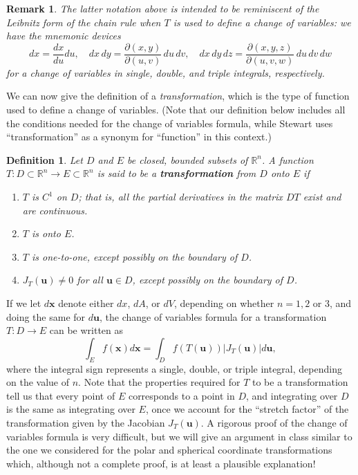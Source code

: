 \documentclass[12pt,letterpaper]{article}
\newtheorem{rem}[theorem]{Remark}
\newenvironment{remark}{\begin{rem}\rm}{\end{rem}}
\newtheorem{definition}[theorem]{Definition}
\newcommand{\R}{\mathbb{R}}
\newcommand{\x}{\mathbf{x}}
\newcommand{\uu}{\mathbf{u}}
\begin{document}
\begin{remark}
The latter notation above is intended to be reminiscent of the Leibnitz form of the chain rule when $T$ is used to define a change of variables: we have the mnemonic devices
\[
dx = \frac{dx}{du}du,\quad dx\,dy = \frac{\partial(x,y)}{\partial (u,v)}\,du\,dv,\quad dx\,dy\,dz = \frac{\partial (x,y,z)}{\partial (u,v,w)}\,du\,dv\,dw
\]
for a change of variables in single, double, and triple integrals, respectively.
\end{remark}
We can now give the definition of a {\em transformation}, which is the type of function used to define a change of variables. (Note that our definition below includes all the conditions needed for the change of variables formula, while Stewart uses ``transformation'' as a synonym for ``function'' in this context.)
\begin{definition}
Let $D$ and $E$ be closed, bounded subsets of $\R^n$. A function $T:D\subset \R^n\to E\subset \R^n$ is said to be a {\bf transformation} from $D$ onto $E$ if
\begin{enumerate}
\item $T$ is  $C^1$ on $D$; that is, all the partial derivatives in the matrix $DT$ exist and are continuous.
\item $T$ is onto $E$.
\item $T$ is one-to-one, except possibly on the boundary of $D$.
\item $J_T(\uu)\neq 0$ for all $\uu\in D$, except possibly on the boundary of $D$.
\end{enumerate}
\end{definition}
If we let $d\x$ denote either $dx$, $dA$, or $dV$, depending on whether $n=1,2$ or 3, and doing the same for  $d\uu$, the change of variables formula for a transformation $T:D\to E$ can be written as
\[
\int_E f(\x)d\x = \int_D f(T(\uu))\lvert J_T(\uu)\rvert d\uu,
\]
where the integral sign represents a single, double, or triple integral, depending on the value of $n$. Note that the properties required for $T$ to be a transformation tell us that every point of $E$ corresponds to a point in $D$, and integrating over $D$ is the same as integrating over $E$, once we account for the ``stretch factor'' of the transformation given by the Jacobian $J_T(\uu)$. A rigorous proof of the change of variables formula is very difficult, but we will give an argument in class similar to the one we considered for the polar and spherical coordinate transformations which, although not a complete proof, is at least a plausible explanation!
\end{document}
